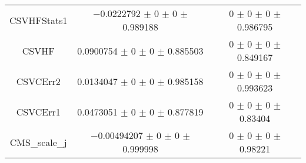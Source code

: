 \begin{table}
\begin{tabular}{ccc}
CSVHFStats1 	& \num{-0.0222792} $\pm$ \num{0} $\pm$ \num{0} $\pm$ \num{0.989188} 	& \num{0} $\pm$ \num{0} $\pm$ \num{0} $\pm$ \num{0.986795}\\
CSVHF 	& \num{0.0900754} $\pm$ \num{0} $\pm$ \num{0} $\pm$ \num{0.885503} 	& \num{0} $\pm$ \num{0} $\pm$ \num{0} $\pm$ \num{0.849167}\\
CSVCErr2 	& \num{0.0134047} $\pm$ \num{0} $\pm$ \num{0} $\pm$ \num{0.985158} 	& \num{0} $\pm$ \num{0} $\pm$ \num{0} $\pm$ \num{0.993623}\\
CSVCErr1 	& \num{0.0473051} $\pm$ \num{0} $\pm$ \num{0} $\pm$ \num{0.877819} 	& \num{0} $\pm$ \num{0} $\pm$ \num{0} $\pm$ \num{0.83404}\\
CMS\_scale\_j 	& \num{-0.00494207} $\pm$ \num{0} $\pm$ \num{0} $\pm$ \num{0.999998} 	& \num{0} $\pm$ \num{0} $\pm$ \num{0} $\pm$ \num{0.98221}\\
\bottomrule
\end{tabular}
\end{table}